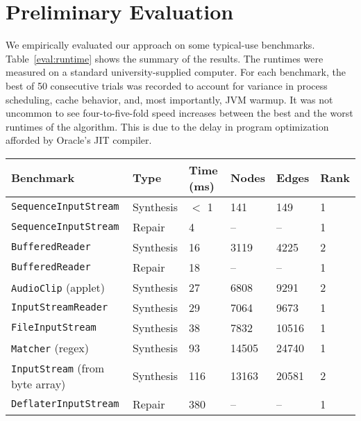 \section{Preliminary Evaluation}
\label{sec:evaluation}

We empirically evaluated our approach on some typical-use benchmarks. Table~\ref{eval:runtime} shows the summary of the results. The runtimes were measured on a standard university-supplied computer. For each benchmark, the best of 50 consecutive trials was recorded to account for variance in process scheduling, cache behavior, and, most importantly, JVM warmup. It was not uncommon to see four-to-five-fold speed increases between the best and the worst runtimes of the algorithm. This is due to the delay in program optimization afforded by Oracle's JIT compiler.

\begin{table*}[t]
  \centering
  \renewcommand{\arraystretch}{1.25}
  \begin{tabularx}{\textwidth}{| X | l | l | l | l | l |}
    \hline
    \textbf{Benchmark} & \textbf{Type} & \textbf{Time (ms)} & \textbf{Nodes} & \textbf{Edges} & \textbf{Rank} \\ \hline
	\texttt{SequenceInputStream} & Synthesis & $<$ 1 & 141   & 149   & 1 \\ \hline
	\texttt{SequenceInputStream} & Repair    & 4   & --    & --    & 1 \\ \hline
    \texttt{BufferedReader}      & Synthesis & 16  & 3119  & 4225  & 2 \\ \hline
    \texttt{BufferedReader}      & Repair    & 18  & --    & --    & 1 \\ \hline
    \texttt{AudioClip} (applet)  & Synthesis & 27  & 6808  & 9291  & 2 \\ \hline
    \texttt{InputStreamReader}   & Synthesis & 29  & 7064  & 9673  & 1 \\ \hline
    \texttt{FileInputStream}     & Synthesis & 38  & 7832  & 10516 & 1 \\ \hline
    \texttt{Matcher} (regex)     & Synthesis & 93  & 14505 & 24740 & 1 \\ \hline
    \texttt{InputStream} (from byte array) & Synthesis & 116 & 13163  & 20581  & 2 \\ \hline
    \texttt{DeflaterInputStream} & Repair    & 380 & -- & -- & 1 \\ \hline
  \end{tabularx}
  \caption{Typical-use runtimes in various benchmarks. ``Nodes'' and ``Edges'' refer to the size of the searched subgraph, and ``Rank'' indicates the correct expression's position among the results. The entire Java standard library was used to build the graph before running the benchmarks. Each test case was initialized with a small environment consisting of five variables.}
  \label{eval:runtime}
\end{table*}


